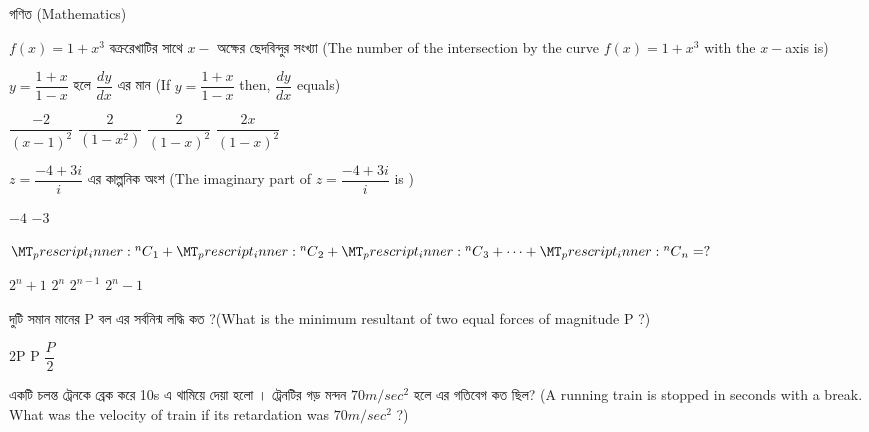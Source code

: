 \documentclass[addpoints]{exam}
\newcommand\Mycomb[2][^n]{\prescript{#1\mkern-0.5mu}{}C_{#2}}
\begin{document}
\begin{LARGE}
\begin{center}
গণিত (Mathematics)
\end{center}
\end{LARGE}
\begin{questions}

 \question  $ f(x) = 1+x^3 $ বক্ররেখাটির সাথে $ x- $ অক্ষের ছেদবিন্দুর সংখ্যা (The number of the intersection by the curve $ f(x) = 1+x^3 $ with the $ x- $axis is)

\begin{oneparchoices}

\end{oneparchoices}

\question  $ y = \dfrac{1+x}{1-x} $ হলে $ \dfrac{dy}{dx} $ এর মান (If $ y = \dfrac{1+x}{1-x} $ then, $ \dfrac{dy}{dx} $ equals)

\begin{oneparchoices}
\choice $ \dfrac{-2}{(x-1)^2} $
\choice $ \dfrac{2}{(1-x^2)} $
\choice $ \dfrac{2}{(1-x)^2} $
\choice $ \dfrac{2x}{(1-x)^2} $

\end{oneparchoices}

\question  $ z= \dfrac{-4+3i}{i} $ এর কাল্পনিক অংশ (The imaginary part of $ z= \dfrac{-4+3i}{i} $ is )

\begin{oneparchoices}
\choice $ -4 $
\choice  $ -3 $
\end{oneparchoices}

\question  $\Mycomb{1} + \Mycomb{2} +\Mycomb{3} + \cdots + \Mycomb{n} = ?$ 

\begin{oneparchoices}
\choice $ 2^{n} + 1 $
\choice $ 2^{n} $
\choice $ 2^{n-1} $
\choice  $ 2^{n} - 1 $
\end{oneparchoices}

\question  দুটি সমান মানের P বল এর সর্বনিন্ম লদ্ধি কত ?(What is the minimum resultant of two equal forces of magnitude P ?) 

\begin{oneparchoices}
\choice 2P
\choice P
\choice $ \dfrac{P}{2} $

\end{oneparchoices}


\question  একটি চলন্ত ট্রেনকে ব্রেক করে 10s এ থামিয়ে দেয়া হলো । ট্রেনটির গড় মন্দন $ 70m/sec^{2} $ হলে এর গতিবেগ কত ছিল? (A running train is stopped in seconds with a break. What was the velocity of train if its retardation was $ 70m/sec^{2} $ ?)


\end{questions}
\end{document}
